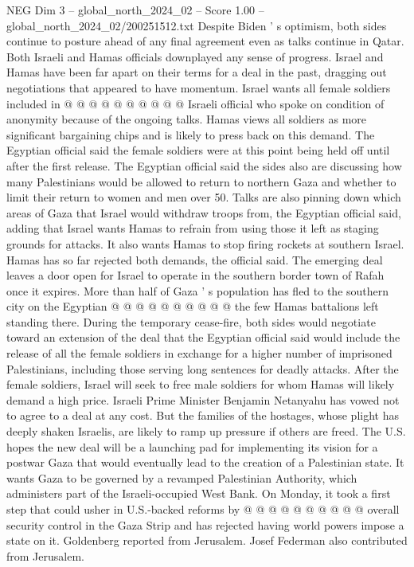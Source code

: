 \begin{textsample}{NEG Dim 3 – global\_north\_2024\_02 – Score 1.00 – global\_north\_2024\_02/200251512.txt}
Despite Biden ' s optimism, both sides continue to posture ahead of any final agreement even as talks continue in Qatar.
Both Israeli and Hamas officials downplayed any sense of progress.
Israel and Hamas have been far apart on their terms for a deal in the past, dragging out negotiations that appeared to have momentum.
Israel wants all female soldiers included in @ @ @ @ @ @ @ @ @ @ Israeli official who spoke on condition of anonymity because of the ongoing talks.
Hamas views all soldiers as more significant bargaining chips and is likely to press back on this demand.
The Egyptian official said the female soldiers were at this point being held off until after the first release.
The Egyptian official said the sides also are discussing how many Palestinians would be allowed to return to northern Gaza and whether to limit their return to women and men over 50.
Talks are also pinning down which areas of Gaza that Israel would withdraw troops from, the Egyptian official said, adding that Israel wants Hamas to refrain from using those it left as staging grounds for attacks.
It also wants Hamas to stop firing rockets at southern Israel.
Hamas has so far rejected both demands, the official said.
The emerging deal leaves a door open for Israel to operate in the southern border town of Rafah once it expires.
More than half of Gaza ' s population has fled to the southern city on the Egyptian @ @ @ @ @ @ @ @ @ @ the few Hamas battalions left standing there.
During the temporary cease-fire, both sides would negotiate toward an extension of the deal that the Egyptian official said would include the release of all the female soldiers in exchange for a higher number of imprisoned Palestinians, including those serving long sentences for deadly attacks.
After the female soldiers, Israel will seek to free male soldiers for whom Hamas will likely demand a high price.
Israeli Prime Minister Benjamin Netanyahu has vowed not to agree to a deal at any cost.
But the families of the hostages, whose plight has deeply shaken Israelis, are likely to ramp up pressure if others are freed.
The U.S. hopes the new deal will be a launching pad for implementing its vision for a postwar Gaza that would eventually lead to the creation of a Palestinian state.
It wants Gaza to be governed by a revamped Palestinian Authority, which administers part of the Israeli-occupied West Bank.
On Monday, it took a first step that could usher in U.S.-backed reforms by @ @ @ @ @ @ @ @ @ @ overall security control in the Gaza Strip and has rejected having world powers impose a state on it.
Goldenberg reported from Jerusalem.
Josef Federman also contributed from Jerusalem.

\end{textsample}
